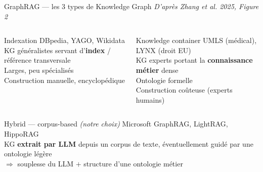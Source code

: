 \documentclass[aspectratio=169,10pt]{beamer}
\begin{document}
\begin{frame}{GraphRAG --- les 3 types de Knowledge Graph}
  \textit{D'après Zhang et al. 2025, Figure 2}

  \begin{columns}[T]
    \begin{block}{\small Indexation}
    \footnotesize
    DBpedia, YAGO, Wikidata\\[0.3em]
    KG généralistes servant d'\textbf{index} / référence transversale\\
    Larges, peu spécialisés\\
    Construction manuelle, encyclopédique
    \end{block}

    \begin{block}{\small Knowledge container}
    \footnotesize
    UMLS (médical), LYNX (droit EU)\\[0.3em]
    KG experts portant la \textbf{connaissance métier} dense\\
    Ontologie formelle\\
    Construction coûteuse (experts humains)
    \end{block}
  \end{columns}

  \vspace{0.6em}
  \begin{columns}
    \begin{alertblock}{\small Hybrid --- corpus-based \textit{(notre choix)}}
    \footnotesize
    Microsoft GraphRAG, LightRAG, HippoRAG\\[0.3em]
    KG \textbf{extrait par LLM} depuis un corpus de texte, éventuellement guidé par une ontologie légère\\
    $\Rightarrow$ souplesse du LLM $+$ structure d'une ontologie métier
    \end{alertblock}
  \end{columns}
\end{frame}
\end{document}
